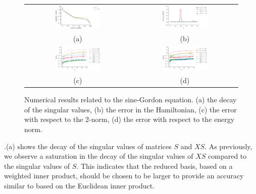 \begin{figure} 
\begin{tabular}{cc}
\includegraphics[width=0.45\textwidth]{./images/paper2/sine/singulars} & \includegraphics[width=0.45\textwidth]{./images/paper2/sine/energy} \\
(a) & (b) \\
\includegraphics[width=0.45\textwidth]{./images/paper2/sine/l2} & \includegraphics[width=0.45\textwidth]{./images/paper2/sine/energy_norm} \\
(c) & (d) \\
\end{tabular}
\caption{Numerical results related to the sine-Gordon equation. (a) the decay of the singular values, (b) the error in the Hamiltonian, (c) the error with respect to the 2-norm, (d) the error with respect to the energy norm.} \label{fig:2}
\end{figure}

.(a) shows the decay of the singular values of matrices $S$ and $XS$. As previously, we observe a saturation in the decay of the singular values of $XS$ compared to the singular values of $S$. This indicates that the reduced basis, based on a weighted inner product, should be chosen to be larger to provide an accuracy similar to based on the Euclidean inner product. 

